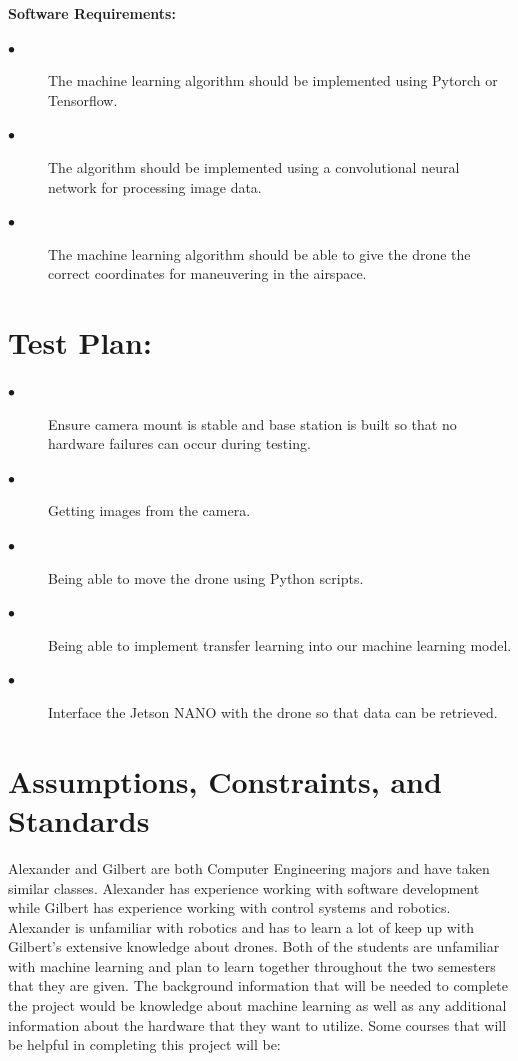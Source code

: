 \documentclass[12pt,onecolumn]{IEEEtran}			%
\begin{document}
\vspace{12pt} 

 \textbf{Software Requirements:}
 
 \begin{description}
  \item[$\bullet$ ] The machine learning algorithm should be implemented using Pytorch or Tensorflow. 
  \item[$\bullet$ ] The algorithm should be implemented using a convolutional neural network for processing image data. 
  \item[$\bullet$ ] The machine learning algorithm should be able to give the drone the correct coordinates for maneuvering in the airspace.
\end{description}
\vspace{12pt} 

 \section{Test Plan:}
  \begin{description}
  \item[$\bullet$ ] Ensure camera mount is stable and base station is built so that no hardware failures can occur during testing. 
  \item[$\bullet$ ] Getting images from the camera. 
  \item[$\bullet$ ] Being able to move the drone using Python scripts.
  \item[$\bullet$ ] Being able to implement transfer learning into our machine learning model. 
  \item[$\bullet$ ] Interface the Jetson NANO with the drone so that data can be retrieved.
  
\end{description} 
\vspace{12pt} 


 
\section{Assumptions, Constraints, and Standards}
Alexander and Gilbert are both Computer Engineering majors and have taken similar classes. Alexander has experience working with software development while Gilbert has experience working with control systems and robotics. Alexander is unfamiliar with robotics and has to learn a lot of keep up with Gilbert's extensive knowledge about drones. Both of the students are unfamiliar with machine learning and plan to learn together throughout the two semesters that they are given. 
The background information that will be needed to complete the project would be knowledge about machine learning as well as any additional information about the hardware that they want to utilize. Some courses that will be helpful in completing this project will be: 
\end{document}
